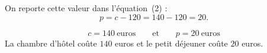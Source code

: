 \documentclass[a4paper,12pt]{article}
\begin{document}
	On reporte cette valeur dans l'équation~(2) :
	\[
	p = c - 120 = 140 - 120 = 20.
	\]
	
	\begin{tcolorbox}[colback=blue!5!white,colframe=blue!50!black,title=Réponse]
		\[
		\boxed{c = 140\ \text{euros}} \qquad \text{et} \qquad \boxed{p = 20\ \text{euros}}
		\]
		La chambre d'hôtel coûte $140$ euros et le petit déjeuner coûte $20$ euros.
	\end{tcolorbox}
	
	
\end{document}
